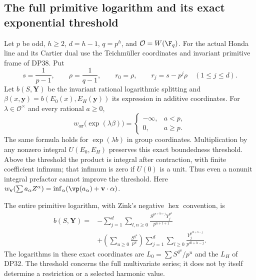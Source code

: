 \subsection{The full primitive logarithm and its exact exponential threshold}

\begin{theorem}\label{DP41}
Let $p$ be odd, $h\ge2$, $d=h-1$, $q=p^h$, and $\mathcal O=W(\F_q)$. For the actual Honda line and its Cartier dual use the Teichm\"uller coordinates and invariant primitive frame of DP38. Put
\[
 s=\frac1{p-1},\qquad \rho=\frac1{q-1},\qquad
 r_0=\rho,\qquad r_j=s-p^j\rho\quad(1\le j\le d).
\]
Let $b(S,\mathbf Y)$ be the invariant rational logarithmic splitting and
$\beta(x,\mathbf y)=b(E_0(x),E_H(\mathbf y))$ its expression in additive coordinates. For $\lambda\in\mathcal O^\times$ and every rational $a\ge0$,
\[
 w_{a\mathbf r}\bigl(\exp(\lambda\beta)\bigr)=
 \begin{cases}-\infty,&a<p,\\0,&a\ge p.\end{cases}
\]
The same formula holds for $\exp(\lambda b)$ in group coordinates. Multiplication by any nonzero integral $U(E_0,E_H)$ preserves this exact boundedness threshold. Above the threshold the product is integral after contraction, with finite coefficient infimum; that infimum is zero if $U(0)$ is a unit. Thus even a nonunit integral prefactor cannot improve the threshold. Here $w_{\mathbf v}(\sum a_\alpha Z^\alpha)=\inf_\alpha(\vp(a_\alpha)+\mathbf v\cdot\alpha)$.

The entire primitive logarithm, with Zink's negative $\operatorname{hex}$ convention, is
\begin{equation}\label{eq:fullprimitive}
\begin{split}
 b(S,\mathbf Y)
 ={}&-\sum_{j=1}^d\sum_{l,n\ge0}
       \frac{S^{p^{n+lh+j}}Y_j^{p^n}}{p^{n+l+1}}\\
 &+\left(\sum_{u\ge0}\frac{S^{q^u}}{p^u}\right)
      \sum_{j=1}^d\sum_{l\ge0}
       \frac{Y_j^{p^{lh+h-j}}}{p^{dl+h-j}}.
\end{split}
\end{equation}
The logarithms in these exact coordinates are $L_0=\sum S^{q^u}/p^u$ and the $L_H$ of DP32. The threshold concerns the full multivariate series; it does not by itself determine a restriction or a selected harmonic value.
\end{theorem}

